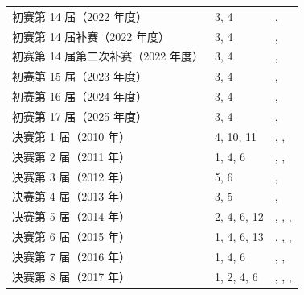 \documentclass[12pt,fontset=fandol]{ctexart}
\begin{document}
\begin{longtable}{p{}p{}p{}}
初赛第 14 届（2022 年度） & 3, 4 & \pageref{ex:ch04-14th-A:3}, \pageref{ex:ch04-14th-A:4}\\

初赛第 14 届补赛（2022 年度） & 3, 4 & \pageref{ex:ch05-14th-A-makeup:3}, \pageref{ex:ch05-14th-A-makeup:4}\\

初赛第 14 届第二次补赛（2022 年度） & 3, 4 & \pageref{ex:ch06-14th-A-makeup2:3}, \pageref{ex:ch06-14th-A-makeup2:4}\\

初赛第 15 届（2023 年度） & 3, 4 & \pageref{ex:ch03-15th-A:3}, \pageref{ex:ch03-15th-A:4}\\

初赛第 16 届（2024 年度） & 3, 4 & \pageref{ex:ch02-16th-A:3}, \pageref{ex:ch02-16th-A:4}\\

初赛第 17 届（2025 年度） & 3, 4 & \pageref{ex:ch01-17th-A:3}, \pageref{ex:ch01-17th-A:4}\\

决赛第 1 届（2010 年） & 4, 10, 11 & \pageref{ex:fin01-all:4}, \pageref{ex:fin01-all:10}, \pageref{ex:fin01-all:11}\\

决赛第 2 届（2011 年） & 1, 4, 6 & \pageref{ex:fin02-all:1}, \pageref{ex:fin02-all:4}, \pageref{ex:fin02-all:6}\\

决赛第 3 届（2012 年） & 5, 6 & \pageref{ex:fin03-all:5}, \pageref{ex:fin03-all:6}\\

决赛第 4 届（2013 年） & 3, 5 & \pageref{ex:fin04-all:3}, \pageref{ex:fin04-all:5}\\

决赛第 5 届（2014 年） & 2, 4, 6, 12 & \pageref{ex:fin05-hi:2}, \pageref{ex:fin05-hi:4}, \pageref{ex:fin05-lo:3}, \pageref{ex:fin05-hi:11}\\

决赛第 6 届（2015 年） & 1, 4, 6, 13 & \pageref{ex:fin06-lo:1}, \pageref{ex:fin06-lo:4}, \pageref{ex:fin06-lo:6}, \pageref{ex:fin06-hi:12}\\

决赛第 7 届（2016 年） & 1, 4, 6 & \pageref{ex:fin07-hi:1}, \pageref{ex:fin07-hi:4}, \pageref{ex:fin07-hi:6}\\

决赛第 8 届（2017 年） & 1, 2, 4, 6 & \pageref{ex:fin08-hi:1}, \pageref{ex:fin08-hi:2}, \pageref{ex:fin08-hi:4}, \pageref{ex:fin08-hi:6}\\


\end{longtable}
\end{document}
